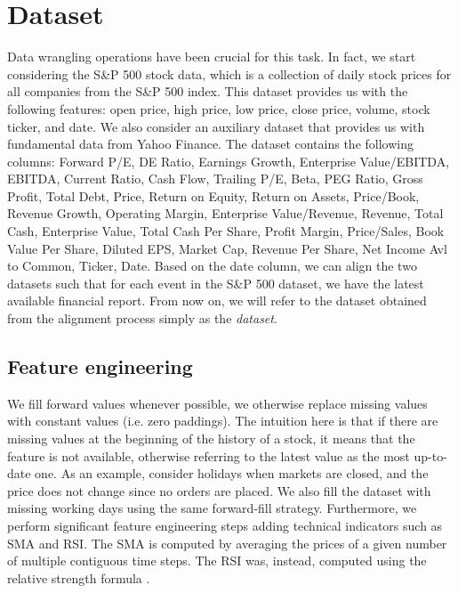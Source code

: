 \documentclass{article}
\begin{document}
\section{Dataset}

Data wrangling operations have been crucial for this task. In fact, we start considering the S\&P 500 stock data, which is a collection of daily stock prices for all companies from the S\&P 500 index. This dataset provides us with the following features: open price, high price, low price, close price, volume, stock ticker, and date. We also consider an auxiliary dataset that provides us with fundamental data from Yahoo Finance. The dataset contains the following columns: Forward P/E, DE Ratio, Earnings Growth, Enterprise Value/EBITDA, EBITDA, Current Ratio, Cash Flow, Trailing P/E, Beta, PEG Ratio, Gross Profit, Total Debt, Price, Return on Equity, Return on Assets, Price/Book, Revenue Growth, Operating Margin, Enterprise Value/Revenue, Revenue, Total Cash, Enterprise Value, Total Cash Per Share, Profit Margin, Price/Sales, Book Value Per Share, Diluted EPS, Market Cap, Revenue Per Share, Net Income Avl to Common, Ticker, Date. Based on the date column, we can align the two datasets such that for each event in the S\&P 500 dataset, we have the latest available financial report. From now on, we will refer to the dataset obtained from the alignment process simply as the \emph{dataset}.

\subsection{Feature engineering}

We fill forward values whenever possible, we otherwise replace missing values with constant values (i.e. zero paddings). The intuition here is that if there are missing values at the beginning of the history of a stock, it means that the feature is not available, otherwise referring to the latest value as the most up-to-date one. As an example, consider holidays when markets are closed, and the price does not change since no orders are placed. We also fill the dataset with missing working days using the same forward-fill strategy.
Furthermore, we perform significant feature engineering steps adding technical indicators
such as SMA and RSI. The SMA is computed by averaging the prices of a given number of multiple
contiguous time steps. The RSI was, instead, computed using the relative strength formula
\cite{rsi}.
\end{document}
